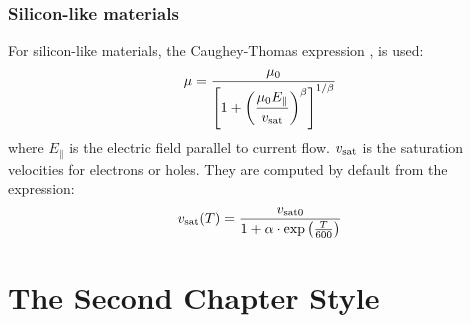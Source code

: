 \documentclass[oneside,12pt]{cgd_book}
\begin{document}
\subsection{Silicon-like materials}\label{velocity saturation+Caughey-Thomas model}For silicon-like materials, the Caughey-Thomas expression
\cite{Caughey1967}, is
            used:
\begin{equation}
\mu = \dfrac{\mu _{0} }{\left[ 1 + \left( \dfrac{\mu _{0} E_{\parallel} }{v_{\rm sat} }
            \right)^\beta \right]^{1/\beta} }
\end{equation}
where $E_{\parallel}$ is the electric field parallel to current flow.
$v_{\rm sat}$ is the saturation velocities for electrons or holes. They are
          computed by default from the expression:
\begin{equation}
v_{\rm sat} (T) = \frac{ v_{\rm sat0} }{ 1 + \alpha \cdot \exp \left( \frac{T}{600} \right)
            }
\end{equation}



\chapter{The Second Chapter Style}
\end{document}
